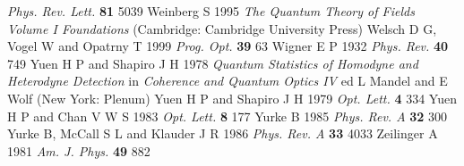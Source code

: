 \documentclass[12pt,amsmath,amssymb]{article}
\numberwithin{equation}{section}
\begin{document}
\begin{thebibliography}{999}
{\it Phys. Rev. Lett.} {\bf 81} 5039
Weinberg S 1995
{\it The Quantum Theory of Fields Volume I Foundations}
(Cambridge: Cambridge University Press)
Welsch D G, Vogel W and Opatrny T 1999
{\it Prog. Opt.} {\bf 39} 63
Wigner E P 1932 {\it Phys. Rev.} {\bf 40} 749
Yuen H P and Shapiro J H 1978 {\it Quantum Statistics of Homodyne
and Heterodyne Detection} in {\it Coherence and Quantum Optics IV}
ed L Mandel and E Wolf (New York: Plenum)
Yuen H P and Shapiro J H 1979
{\it Opt. Lett.} {\bf 4} 334
Yuen H P and Chan V W S 1983 {\it Opt. Lett.} {\bf 8} 177
Yurke B 1985 {\it Phys. Rev. A} {\bf 32} 300
Yurke B, McCall S L and Klauder J R 1986 {\it Phys. Rev. A} {\bf
33} 4033
Zeilinger A 1981 {\it Am. J. Phys.} {\bf 49} 882
\end{thebibliography}
\end{document}

